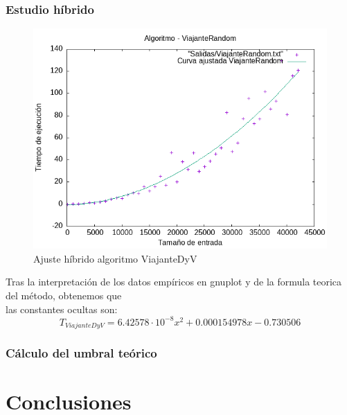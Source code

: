 \documentclass[11pt,openany]{book}
\begin{document}
\subsection{Estudio híbrido}
\begin{center}
      \begin{figure}[H]
            \centering
            \includegraphics[width=0.7\linewidth]{assets/Img/ViajanteRandom_hib.png}
            \caption{Ajuste híbrido algoritmo ViajanteDyV}
            \label{fig:ViajanteDyV}
      \end{figure}
\end{center}
Tras la interpretación de los datos empíricos en gnuplot y de la formula teorica del método, obtenemos que \\
las constantes ocultas son:
\begin{equation*}
      T_{ViajanteDyV}=6.42578 \cdot 10^{-8} x^2 +0.000154978 x-0.730506
\end{equation*}
\subsection{Cálculo del umbral teórico}




\chapter{Conclusiones}
\end{document}
